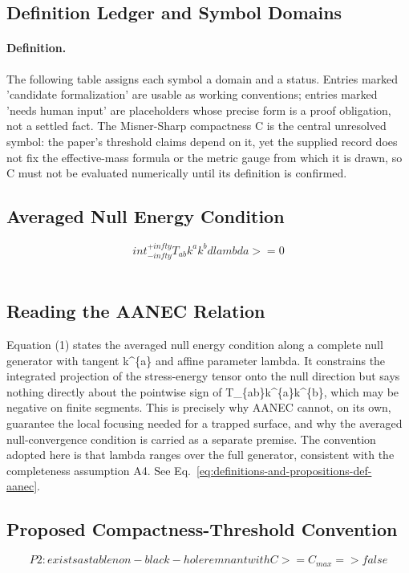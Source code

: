 \documentclass[conference]{IEEEtran}
\begin{document}
\subsection{Definition Ledger and Symbol Domains}
\paragraph{Definition.} The following table assigns each symbol a domain and a status. Entries marked 'candidate formalization' are usable as working conventions; entries marked 'needs human input' are placeholders whose precise form is a proof obligation, not a settled fact. The Misner-Sharp compactness C is the central unresolved symbol: the paper's threshold claims depend on it, yet the supplied record does not fix the effective-mass formula or the metric gauge from which it is drawn, so C must not be evaluated numerically until its definition is confirmed.

\subsection{Averaged Null Energy Condition}
\begin{equation}
int_{-infty}^{+infty} T_{ab} k^{a} k^{b} d lambda >= 0
\label{eq:definitions-and-propositions-def-aanec}
\end{equation}~\cite{cite_0ed84243cf171bc4}

\subsection{Reading the AANEC Relation}
Equation (1) states the averaged null energy condition along a complete null generator with tangent k\textasciicircum{}\{a\} and affine parameter lambda. It constrains the integrated projection of the stress-energy tensor onto the null direction but says nothing directly about the pointwise sign of T\_\{ab\}k\textasciicircum{}\{a\}k\textasciicircum{}\{b\}, which may be negative on finite segments. This is precisely why AANEC cannot, on its own, guarantee the local focusing needed for a trapped surface, and why the averaged null-convergence condition is carried as a separate premise. The convention adopted here is that lambda ranges over the full generator, consistent with the completeness assumption A4. See Eq.~\eqref{eq:definitions-and-propositions-def-aanec}.~\cite{cite_0ed84243cf171bc4}

\subsection{Proposed Compactness-Threshold Convention}
\begin{equation}
P2 : exists a stable non-black-hole remnant with C >= C_{max} => false
\label{eq:definitions-and-propositions-def-threshold}
\end{equation}
\end{document}
